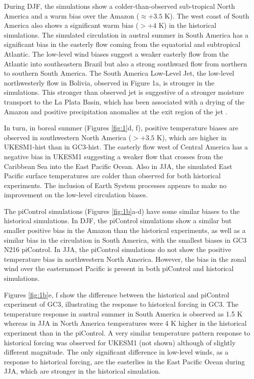  During DJF, the simulations show a colder-than-observed sub-tropical North America and a warm bias over the Amazon ($\approx +3.5$ K).
 The west coast of South America also shows a significant warm bias ($>+4$ K) in the historical simulations.
 The simulated circulation in austral summer in South America has a significant bias in the easterly flow coming from the equatorial and subtropical Atlantic.
 The low-level wind biases suggest a weaker easterly flow from the Atlantic into southeastern Brazil but also a strong southward flow from northern to southern South America.
  The South America Low-Level Jet, the low-level northwesterly flow in Bolivia, observed in Figure 1a, is stronger in the simulations.
   This stronger than observed jet is suggestive of a stronger moisture transport to the La Plata Basin, which has been associated with a drying of the Amazon and positive precipitation anomalies at the exit region of the jet \citep{marengo2012,jones2017}.


In turn, in boreal summer (Figures \ref{fig:1}d, f), positive temperature biases are observed in southwestern North America ($>+3.5 $ K), which are higher in UKESM1-hist than in GC3-hist.
 The easterly flow west of Central America has a negative bias in UKESM1 suggesting a weaker flow that crosses from the Caribbean Sea into the East Pacific Ocean.
 Also in JJA, the simulated East Pacific surface temperatures are colder than observed for both historical experiments.      The inclusion of Earth System processes appears to make no  improvement on the low-level circulation biases. 

The piControl simulations (Figures \ref{fig:1b}a-d) have some similar biases to the historical simulations.
 In DJF, the piControl simulations show a similar but smaller positive bias in the Amazon than the historical experiments, as well as a similar bias in the circulation in South America, with the smallest biases in GC3 N216 piControl.
 In JJA, the piControl simulations do not show the positive temperature bias in northwestern North America. However, the bias in the zonal wind over the easternmost Pacific is present in both piControl and historical simulations.
 
 Figures \ref{fig:1b}e, f show the difference between the historical and piControl experiment of GC3, illustrating the response to historical forcing in GC3.
 The temperature response in austral summer in South America is observed as 1.5 K whereas in JJA in North America temperatures were 4 K higher in the historical experiment than in the piControl.
 A very similar temperature pattern response to historical forcing was observed for UKESM1 (not shown) although of slightly different magnitude. The only significant difference in low-level winds, as a response to historical forcing, are the easterlies in the East Pacific Ocean during JJA, which are stronger in the historical simulation. %

